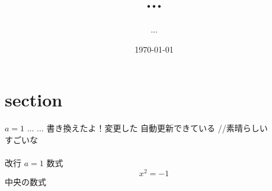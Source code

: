 \documentclass[11pt,a4paper]{jsarticle}
\title{...}
\author{...}
\date{\today}
\begin{document}
\maketitle
%
%
\section{section}
$a=1$
...
...
書き換えたよ！変更した
自動更新できている
//素晴らしい
\\すごいな
\\
\\
改行
$a=1$
数式
$$x^2=-1$$
中央の数式
\end{document}
